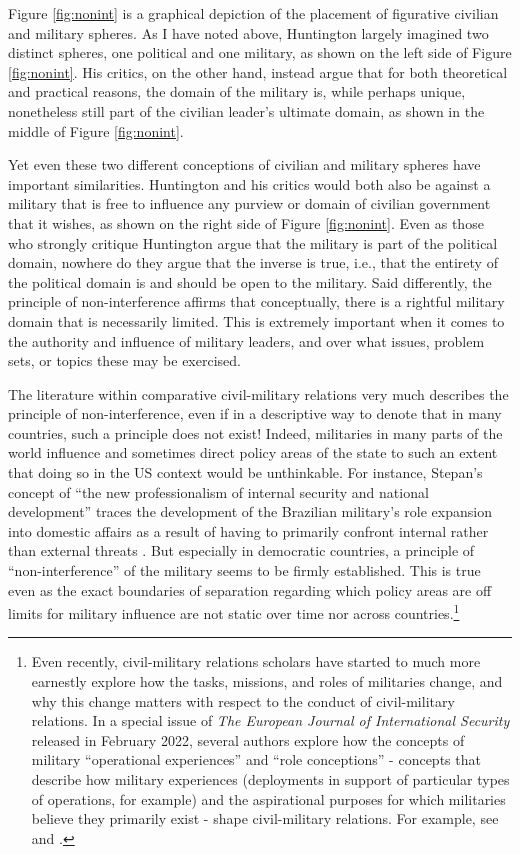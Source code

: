 \documentclass[
  12pt,
  oneside]{memoir}
\begin{document}
Figure \ref{fig:nonint} is a graphical depiction of the placement of figurative civilian and military spheres. As I have noted above, Huntington largely imagined two distinct spheres, one political and one military, as shown on the left side of Figure \ref{fig:nonint}. His critics, on the other hand, instead argue that for both theoretical and practical reasons, the domain of the military is, while perhaps unique, nonetheless still part of the civilian leader's ultimate domain, as shown in the middle of Figure \ref{fig:nonint}.

Yet even these two different conceptions of civilian and military spheres have important similarities. Huntington and his critics would both also be against a military that is free to influence any purview or domain of civilian government that it wishes, as shown on the right side of Figure \ref{fig:nonint}. Even as those who strongly critique Huntington argue that the military is part of the political domain, nowhere do they argue that the inverse is true, i.e., that the entirety of the political domain is and should be open to the military. Said differently, the principle of non-interference affirms that conceptually, there is a rightful military domain that is necessarily limited. This is extremely important when it comes to the authority and influence of military leaders, and over what issues, problem sets, or topics these may be exercised.

The literature within comparative civil-military relations very much describes the principle of non-interference, even if in a descriptive way to denote that in many countries, such a principle does not exist! Indeed, militaries in many parts of the world influence and sometimes direct policy areas of the state to such an extent that doing so in the US context would be unthinkable. For instance, Stepan's concept of ``the new professionalism of internal security and national development'' traces the development of the Brazilian military's role expansion into domestic affairs as a result of having to primarily confront internal rather than external threats \autocite{stepan_new_1973}. But especially in democratic countries, a principle of ``non-interference'' of the military seems to be firmly established. This is true even as the exact boundaries of separation regarding which policy areas are off limits for military influence are not static over time nor across countries.\footnote{Even recently, civil-military relations scholars have started to much more earnestly explore how the tasks, missions, and roles of militaries change, and why this change matters with respect to the conduct of civil-military relations. In a special issue of \emph{The European Journal of International Security} released in February 2022, several authors explore how the concepts of military ``operational experiences'' and ``role conceptions'' - concepts that describe how military experiences (deployments in support of particular types of operations, for example) and the aspirational purposes for which militaries believe they primarily exist - shape civil-military relations. For example, see \textcite{harig_operational_2022} and \textcite{wilen_versatile_2022}.}
\end{document}
